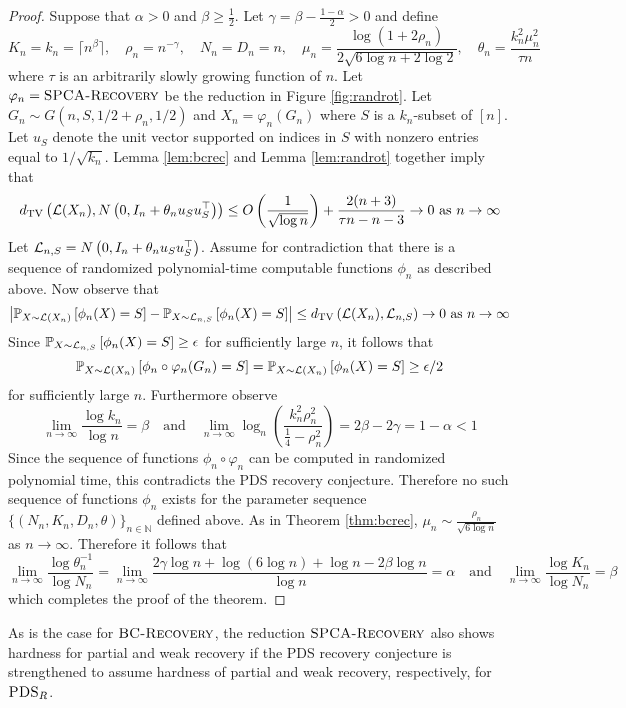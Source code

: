 \begin{proof}
Suppose that $\alpha > 0$ and $\beta \ge \frac{1}{2}$. Let $\gamma =  \beta - \frac{1 - \alpha}{2} > 0$ and define 
$$K_n = k_n = \lceil n^{\beta} \rceil, \quad \rho_n = n^{-\gamma}, \quad N_n = D_n = n, \quad \mu_n = \frac{\log (1 + 2\rho_n)}{2 \sqrt{6 \log n + 2\log 2}}, \quad \theta_n = \frac{k_n^2 \mu_n^2}{\tau n}$$
where $\tau$ is an arbitrarily slowly growing function of $n$. Let $\varphi_n = \textsc{SPCA-Recovery}$ be the reduction in Figure \ref{fig:randrot}. Let $G_n \sim G(n, S, 1/2 + \rho_n, 1/2)$ and $X_n = \varphi_n(G_n)$ where $S$ is a $k_n$-subset of $[n]$. Let $u_S$ denote the unit vector supported on indices in $S$ with nonzero entries equal to $1/\sqrt{k_n}$. Lemma \ref{lem:bcrec} and Lemma \ref{lem:randrot} together imply that
$$d_{\text{TV}}\left( \mathcal{L}(X_n), N\left( 0, I_n + \theta_n u_S u_S^\top \right) \right) \le O\left( \frac{1}{\sqrt{\log n}} \right) + \frac{2(n+3)}{\tau n - n - 3} \to 0 \text{ as } n \to \infty$$
Let $\mathcal{L}_{n, S} = N\left( 0, I_n + \theta_n u_S u_S^\top \right)$. Assume for contradiction that there is a sequence of randomized polynomial-time computable functions $\phi_n$ as described above. Now observe that
$$\left| \mathbb{P}_{X \sim \mathcal{L}(X_n)} \left[ \phi_n(X) = S \right] - \mathbb{P}_{X \sim \mathcal{L}_{n, S}}\left[ \phi_n(X) = S\right]\right| \le d_{\text{TV}}\left( \mathcal{L}(X_n), \mathcal{L}_{n, S} \right) \to 0 \text{ as } n \to \infty$$
Since $\mathbb{P}_{X \sim \mathcal{L}_{n, S}}\left[\phi_n(X) = S \right] \ge \epsilon$ for sufficiently large $n$, it follows that
$$\mathbb{P}_{X \sim \mathcal{L}(X_n)} \left[ \phi_n \circ \varphi_n(G_n) = S \right] = \mathbb{P}_{X \sim \mathcal{L}(X_n)} \left[ \phi_n(X) = S \right] \ge \epsilon/2$$
for sufficiently large $n$. Furthermore observe
$$\lim_{n \to \infty} \frac{\log k_n}{\log n} = \beta \quad \text{and} \quad \lim_{n \to \infty} \log_n \left( \frac{k_n^2 \rho_n^2}{\frac{1}{4} - \rho_n^2} \right) = 2\beta - 2\gamma = 1 - \alpha < 1$$
Since the sequence of functions $\phi_n \circ \varphi_n$ can be computed in randomized polynomial time, this contradicts the PDS recovery conjecture. Therefore no such sequence of functions $\phi_n$ exists for the parameter sequence $\{ (N_n, K_n, D_n, \theta) \}_{n \in \mathbb{N}}$ defined above. As in Theorem \ref{thm:bcrec}, $\mu_n \sim \frac{\rho_n}{\sqrt{6 \log n}}$ as $n \to \infty$.
Therefore it follows that
$$\lim_{n \to \infty} \frac{\log \theta_n^{-1}}{\log N_n} = \lim_{n \to \infty} \frac{2\gamma \log n + \log (6\log n) + \log n - 2\beta \log n}{\log n} = \alpha \quad \text{and} \quad \lim_{n \to \infty} \frac{\log K_n}{\log N_n} = \beta$$
which completes the proof of the theorem.
\end{proof}

As is the case for $\textsc{BC-Recovery}$, the reduction $\textsc{SPCA-Recovery}$ also shows hardness for partial and weak recovery if the PDS recovery conjecture is strengthened to assume hardness of partial and weak recovery, respectively, for $\textsc{PDS}_R$.
